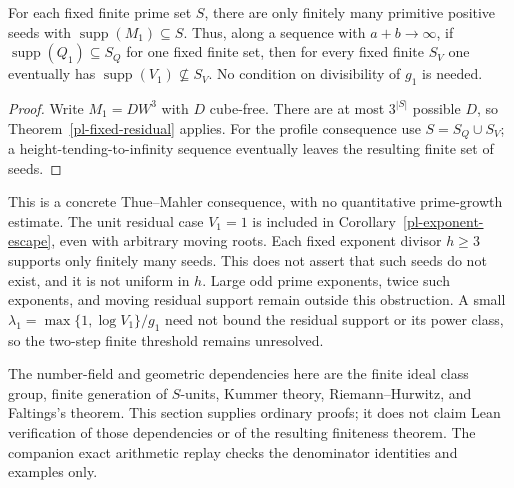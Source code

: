 \begin{corollary}\label{pl-total-support}
For each fixed finite prime set $S$, there are only finitely many
primitive positive seeds with $\operatorname{supp}(M_1)\subseteq S$.
Thus, along a sequence with $a+b\longrightarrow\infty$, if
$\operatorname{supp}(Q_1)\subseteq S_Q$ for one fixed finite set,
then for every fixed finite $S_V$ one eventually has
$\operatorname{supp}(V_1)\not\subseteq S_V$. No condition on
divisibility of $g_1$ is needed.
\end{corollary}
\begin{proof}
Write $M_1=DW^3$ with $D$ cube-free. There are at most $3^{|S|}$
possible $D$, so Theorem~\ref{pl-fixed-residual} applies. For the
profile consequence use $S=S_Q\cup S_V$; a height-tending-to-infinity
sequence eventually leaves the resulting finite set of seeds.
\end{proof}

This is a concrete Thue--Mahler consequence, with no quantitative
prime-growth estimate. The unit residual case $V_1=1$ is included in
Corollary~\ref{pl-exponent-escape}, even with arbitrary moving
roots. Each fixed exponent divisor $h\ge3$ supports only finitely many
seeds. This does not assert that such seeds do not exist, and it is
not uniform in $h$. Large odd prime exponents, twice such exponents,
and moving residual support remain outside this obstruction. A small
$\lambda_1=\max\{1,\log V_1\}/g_1$ need not bound the residual support
or its power class, so the two-step finite threshold remains unresolved.

The number-field and geometric dependencies here are the finite ideal
class group, finite generation of $S$-units, Kummer theory,
Riemann--Hurwitz, and Faltings's theorem. This section supplies ordinary
proofs; it does not claim Lean verification of those dependencies or
of the resulting finiteness theorem. The companion exact arithmetic
replay checks the denominator identities and examples only.
